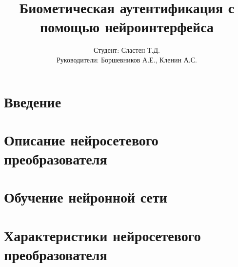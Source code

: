 \documentclass{beamer}
\title{Биометическая аутентификация с помощью нейроинтерфейса}
\author{Студент: Сластен Т.Д. \\ Руководители: Боршевников А.Е., Кленин А.С.}
\institute{Б8303а Прикладная математика и информатика}
\date{}
\begin{document}
\maketitle

\section{Введение}




\section{Описание нейросетевого преобразователя}




\section{Обучение нейронной сети}



\section{Характеристики нейросетевого преобразователя}

\end{document}
